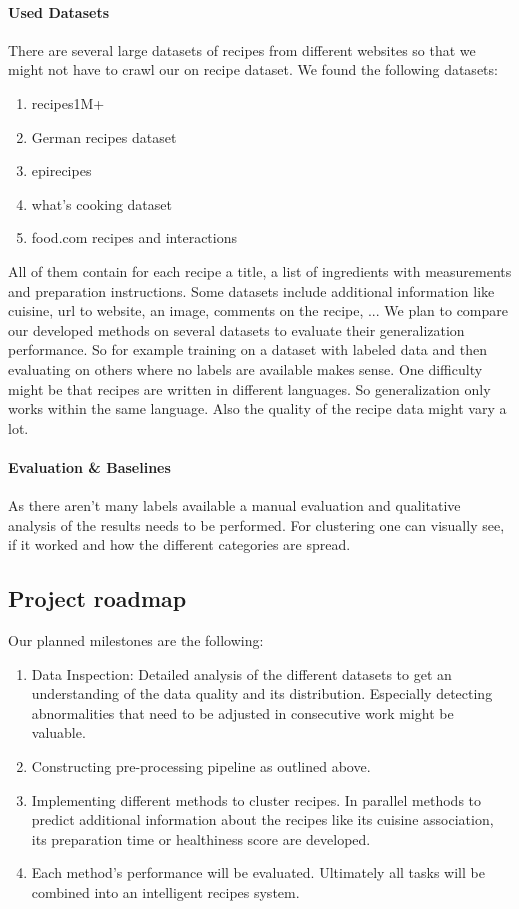 \documentclass[
     12pt,         %
     a4paper,      %
     BCOR10mm,     %
     DIV14,        %
     ]{article}
\begin{document}
\paragraph{Used Datasets} There are several large datasets of recipes from different websites so that we might not have to crawl our on recipe dataset. We found the following datasets:
\begin{enumerate}
  \item recipes1M+
  \item German recipes dataset
  \item epirecipes
  \item what's cooking dataset
  \item food.com recipes and interactions
\end{enumerate}
All of them contain for each recipe a title, a list of ingredients with measurements and preparation instructions. Some datasets include additional information like cuisine, url to website, an image, comments on the recipe, ...
We plan to compare our developed methods on several datasets to evaluate their generalization performance. So for example training on a dataset with labeled data and then evaluating on others where no labels are available makes sense. One difficulty might be that recipes are written in different languages. So generalization only works within the same language. Also the quality of the recipe data might vary a lot.

\paragraph{Evaluation \& Baselines} As there aren't many labels available a manual evaluation and qualitative analysis of the results needs to be performed. For clustering one can visually see, if it worked and how the different categories are spread.


\subsection{Project roadmap}

Our planned milestones are the following:

\begin{enumerate}
  \item Data Inspection: Detailed analysis of the different datasets to get an understanding of the data quality and its distribution. Especially detecting abnormalities that need to be adjusted in consecutive work might be valuable.
  \item Constructing pre-processing pipeline as outlined above.
  \item Implementing different methods to cluster recipes. In parallel methods to predict additional information about the recipes like its cuisine association, its preparation time or healthiness score are developed.
  \item Each method's performance will be evaluated. Ultimately all tasks will be combined into an intelligent recipes system.
\end{enumerate}
\end{document}

